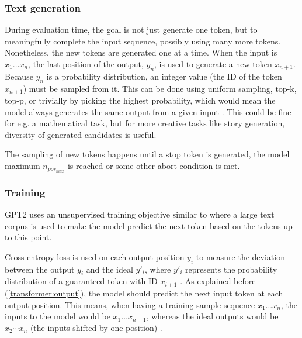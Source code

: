 \subsubsection{Text generation}
\label{gpt2:textgen}


During evaluation time, the goal is not just generate one token, but to meaningfully complete the input sequence, possibly using many more tokens.
Nonetheless, the new tokens are generated one at a time. When the input is $x_1 \ldots x_n$, the last position of the output, $y_n$, is used to generate a new token $x_{n+1}$.
Because $y_n$ is a probability distribution, an integer value (the ID of the token $x_{n+1}$) must be sampled from it. This can be done using uniform sampling,
top-k, top-p, or trivially by picking the highest probability, which would mean the model always generates the same output from a given input \cite{hf-howtogeneratetext}.
This could be fine for e.g. a mathematical task, but for more creative tasks like story generation, diversity of generated candidates is useful.

The sampling of new tokens happens until a stop token is generated, the model maximum $n_{pos_{max}}$ is reached or some other abort condition is met. \cite[p.2 ]{allyouneed}


\subsubsection{Training}
\label{gpt2:training}

GPT2 uses an unsupervised training objective similar to  where a large text corpus is used to make the model predict the next token based on the tokens up to this point.

Cross-entropy loss is used on each output position $y_i$ to measure the deviation between the output $y_i$ and the ideal $y'_i$,
where $y'_i$ represents the probability distribution of a guaranteed token with ID $x_{i+1}$  \cite{HuggingFaceGPT2}.
As explained before (\cref{transformer:output}), the model should predict the next input token at each output position. This means, when having a training sample sequence $x_1 \ldots x_n$, the inputs to the model would be $x_1 \ldots x_{n-1}$, whereas the ideal outputs would be $x_2 \cdots x_n$ (the inputs shifted by one position)  .


